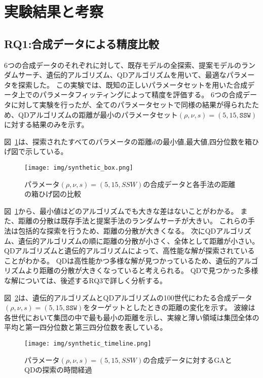 \documentclass[uplatex,11pt,openany]{ujreport}
\begin{document}
    \section{実験結果と考察}
        \subsection{RQ1:合成データによる精度比較}
            6つの合成データのそれぞれに対して、既存モデルの全探索、提案モデルのランダムサーチ、遺伝的アルゴリズム、QDアルゴリズムを用いて、最適なパラメータを探索した。
            この実験では、既知の正しいパラメータセットを用いた合成データ上でのパラメータフィッティングによって精度を評価する。
            6つの合成データに対して実験を行ったが、全てのパラメータセットで同様の結果が得られたため、QDアルゴリズムの距離が最小のパラメータセット$(\rho, \nu, s) = (5, 15, \texttt{SSW})$に対する結果のみを示す。

            図~\ref{fig:synthetic_boxplot}は、探索されたすべてのパラメータの距離$d$の最小値,最大値,四分位数を箱ひげ図で示している。
            \begin{figure}[H]
                \centering
                \texttt{[image: img/synthetic\_box.png]}
                \caption{パラメータ$(\rho,\nu,s)=(5,15,SSW)$の合成データと各手法の距離の箱ひげ図の比較}
                \label{fig:synthetic_boxplot}
            \end{figure}


            図~\ref{fig:synthetic_boxplot}から、最小値はどのアルゴリズムでも大きな差はないことがわかる。
            また、距離の分散は既存手法と提案手法のランダムサーチが大きい。
            これらの手法は包括的な探索を行うため、距離の分散が大きくなる。
            次にQDアルゴリズム、遺伝的アルゴリズムの順に距離の分散が小さく、全体として距離が小さい。
            QDアルゴリズムと遺伝的アルゴリズムによって、高性能な解が探索されていることがわかる。
            QDは高性能かつ多様な解が見つかっているため、遺伝的アルゴリズムより距離の分散が大きくなっていると考えられる。
            QDで見つかった多様な解については、後述するRQ3で詳しく分析する。


            図~\ref{fig:synthetic_timeline}は、遺伝的アルゴリズムとQDアルゴリズムの100世代にわたる合成データ$(\rho, \nu, s) = (5, 15, \texttt{SSW})$をターゲットとしたときの距離の変化を示す。
            波線は各世代において集団の中で最も最小の距離を示し、実線と薄い領域は集団全体の平均と第一四分位数と第三四分位数を表している。

            \begin{figure}[H]
                \centering
                \texttt{[image: img/synthetic\_timeline.png]}
                \caption{パラメータ$(\rho,\nu,s)=(5,15,SSW)$の合成データに対するGAとQDの探索の時間経過}
                \label{fig:synthetic_timeline}
            \end{figure}
\end{document}
